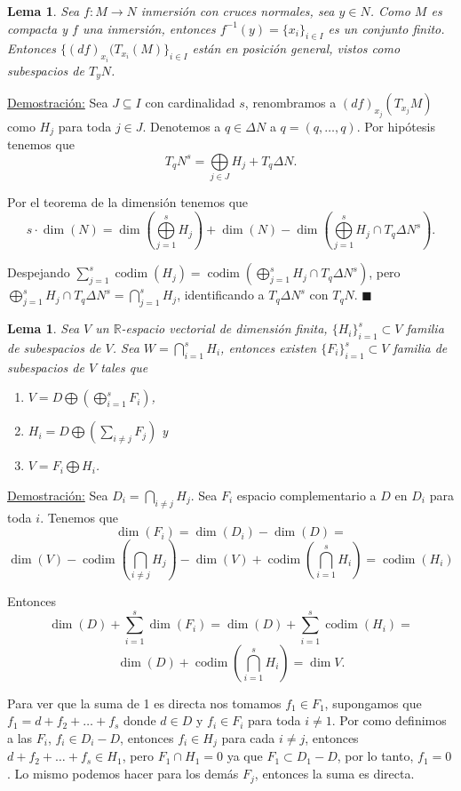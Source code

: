 \documentclass{report}
\newtheorem{lem}[theorem]{Lema}
\theoremstyle{definition}
\DeclareMathOperator{\cod}{codim}
\begin{document}
\begin{lem}
Sea $f:M \to N$ inmersi\'on con cruces normales, sea $y \in N$. Como $M$ es compacta y $f$ una inmersi\'on, entonces $f^{-1} (y) = \{ x_i \}_{i \in I}$ es un conjunto finito. Entonces $\{ (df)_{x_i} (T_{x_i} (M) \}_{i \in I}$ est\'an en posici\'on general, vistos como subespacios de $T_y N$.
\end{lem}

\underline{Demostraci\'on:} Sea $J \subseteq I$ con cardinalidad $s$, renombramos a $(df)_{x_j} (T_{x_j} M)$ como $H_j$ para toda $j \in J$. Denotemos a $q \in \Delta N$ a $q = (q , \dots , q)$. Por hip\'otesis tenemos que 
$$T_q N^s = \bigoplus\limits_{j \in J} H_j + T_q \Delta N .$$

Por el teorema de la dimensi\'on tenemos que 
$$s \cdot \dim (N) = \dim (\bigoplus\limits_{j=1}^s H_j) + \dim (N)- \dim (\bigoplus\limits_{j=1}^s H_j \cap T_q \Delta N^s) .$$

Despejando $\sum\limits_{j=1}^s \cod (H_j) = \cod (\bigoplus\limits_{j=1}^s H_j \cap T_q \Delta N^s)$, pero $\bigoplus\limits_{j=1}^s H_j \cap T_q \Delta N^s = \bigcap\limits_{j=1}^s H_j$, identificando a $T_q \Delta N^s$ con $T_q N$. $\blacksquare$

\begin{lem}
Sea $V$ un $\mathbb{R}$-espacio vectorial de dimensi\'on finita, $\{ H_i \}_{i=1}^s \subset V$ familia de subespacios de $V$. Sea $W = \bigcap\limits_{i=1}^s H_i$, entonces existen $\{ F_i \}_{i=1}^s \subset V$ familia de subespacios de $V$ tales que 
\begin{enumerate}
\item $V = D \bigoplus (\bigoplus\limits_{i=1}^s F_i)$,
\item $H_i = D \bigoplus( \sum\limits_{i\neq j} F_j)$ y
\item  $V= F_i \bigoplus H_i$.
\end{enumerate}
\end{lem}

\underline{Demostraci\'on:} Sea $D_i = \bigcap\limits_{i \neq j} H_j$. Sea $F_i$ espacio complementario a $D$ en $D_i$ para toda $i$. Tenemos que $$\dim (F_i) = \dim (D_i) - \dim (D) =$$ $$\dim(V) - \cod ( \bigcap\limits_{i \neq j} H_j) - \dim (V) + \cod ( \bigcap\limits_{i=1}^s H_i)= \cod (H_i)$$

Entonces $$\dim(D) + \sum\limits_{i=1}^s \dim (F_i)= \dim (D) + \sum\limits_{i=1}^s \cod (H_i) = $$ $$\dim(D) + \cod ( \bigcap\limits_{i=1}^s H_i) = \dim V.$$

Para ver que la suma de 1 es directa nos tomamos $f_1 \in F_1$, supongamos que $f_1 = d + f_2 + \dots + f_s$ donde $d \in D$ y $f_i \in F_i$ para toda $i \neq 1$. Por como definimos a las $F_i$, $f_i \in D_i - D$, entonces $f_i \in H_j$ para cada $i \neq j$, entonces $d + f_2 + \dots + f_s \in H_1$, pero $F_1 \cap H_1 = 0$ ya que $F_1 \subset D_1 - D$, por lo tanto, $f_1 = 0$. Lo mismo podemos hacer para los dem\'as $F_j$, entonces la suma es directa.
\end{document}
